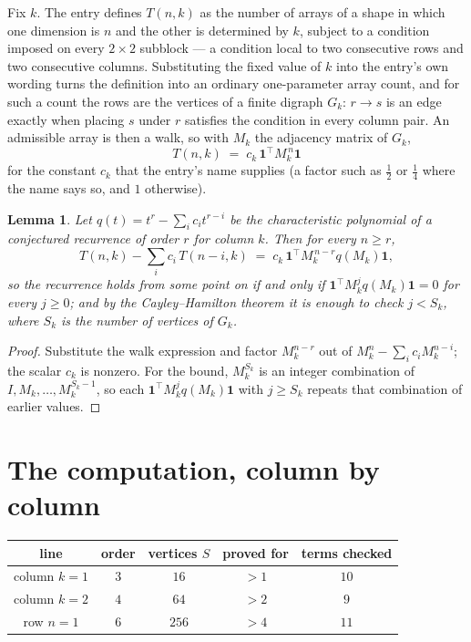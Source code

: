 \documentclass[11pt,a4paper]{article}
\theoremstyle{plain}
\newtheorem{lemma}[theorem]{Lemma}
\theoremstyle{definition}
\begin{document}
Fix $k$. The entry defines $T(n,k)$ as the number of arrays of a shape in which one dimension
is $n$ and the other is determined by $k$, subject to a condition imposed on every
$2\times2$ subblock --- a condition local to two consecutive rows and two consecutive columns.
Substituting the fixed value of $k$ into the entry's own wording turns the definition into an
ordinary one-parameter array count, and for such a count the rows are the vertices of a finite
digraph $G_k$: $r\to s$ is an edge exactly when placing $s$ under $r$ satisfies the condition
in every column pair. An admissible array is then a walk, so with $M_k$ the adjacency matrix
of $G_k$,
\[
T(n,k)\;=\;c_k\,\mathbf{1}^{\!\top}M_k^{\,n}\mathbf{1}
\]
for the constant $c_k$ that the entry's name supplies (a factor such as $\tfrac12$ or
$\tfrac14$ where the name says so, and $1$ otherwise).

\begin{lemma}\label{lem:crit}
Let $q(t)=t^{r}-\sum_i c_it^{r-i}$ be the characteristic polynomial of a conjectured
recurrence of order $r$ for column $k$. Then for every $n\ge r$,
\[
T(n,k)-\sum_i c_i\,T(n-i,k)\;=\;c_k\,\mathbf{1}^{\!\top}M_k^{\,n-r}q(M_k)\mathbf{1},
\]
so the recurrence holds from some point on if and only if
$\mathbf{1}^{\!\top}M_k^{j}q(M_k)\mathbf{1}=0$ for every $j\ge0$; and by the
Cayley--Hamilton theorem it is enough to check $j<S_k$, where $S_k$ is the number of vertices
of $G_k$.
\end{lemma}

\begin{proof}
Substitute the walk expression and factor $M_k^{n-r}$ out of $M_k^{n}-\sum_ic_iM_k^{n-i}$;
the scalar $c_k$ is nonzero. For the bound, $M_k^{S_k}$ is an integer combination of
$I,M_k,\dots,M_k^{S_k-1}$, so each $\mathbf{1}^{\!\top}M_k^{j}q(M_k)\mathbf{1}$ with
$j\ge S_k$ repeats that combination of earlier values.
\end{proof}

\section{The computation, column by column}

\begin{center}
\begin{tabular}{ccccc}
line & order & vertices $S$ & proved for & terms checked \\ \hline
column $k$$=1$ & $3$ & $16$ & $>1$ & $10$ \\
column $k$$=2$ & $4$ & $64$ & $>2$ & $9$ \\
row $n$$=1$ & $6$ & $256$ & $>4$ & $11$ \\
\end{tabular}
\end{center}
\end{document}
